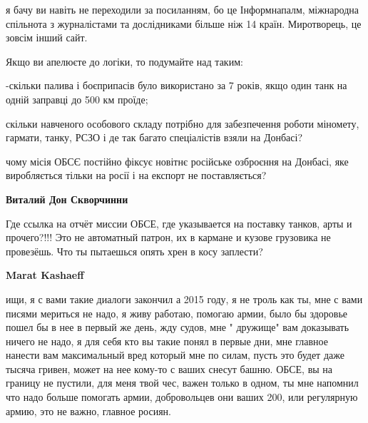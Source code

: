 \begin{itemize}
\begin{itemize}
я бачу ви навіть не переходили за посиланням, бо це Інформнапалм, міжнародна
спільнота з журналістами та дослідниками більше ніж 14 країн. Миротворець, це
зовсім інший сайт.

Якщо ви апелюєте до логіки, то подумайте над таким:

-скільки палива і боєприпасів було використано за 7 років, якщо один танк на
одній заправці до 500 км проїде;

скільки навченого особового складу потрібно для забезпечення роботи міномету,
гармати, танку, РСЗО і де так багато спеціалістів взяли на Донбасі?

чому місія ОБСЄ постійно фіксує новітнє російське озброєння на Донбасі, яке
виробляється тільки на росії і на експорт не поставляється?

 
\textbf{Виталий Дон Скворчинни} 

Где ссылка на отчёт миссии ОБСЕ, где указывается на поставку танков, арты и
прочего?!!! Это не автоматный патрон, их в кармане и кузове грузовика не
провезёшь. Что ты пытаешься опять хрен в косу заплести?


 
\textbf{Marat Kashaeff} 

ищи, я с вами такие диалоги закончил а 2015 году, я не троль как ты, мне с вами
писями мериться не надо, я живу работаю, помогаю армии, было бы здоровье пошел
бы в нее в первый же день, жду судов, мне " дружище" вам доказывать ничего не
надо, я для себя кто вы такие понял в первые дни, мне главное нанести вам
максимальный вред который мне по силам, пусть это будет даже тысяча гривен,
может на нее кому-то с ваших снесут башню. ОБСЕ, вы на границу не пустили, для
меня твой чес, важен только в одном, ты мне напомнил что надо больше помогать
армии, добровольцев они ваших 200, или регулярную армию, это не важно, главное
росиян.

 

\end{itemize}
\end{itemize}
